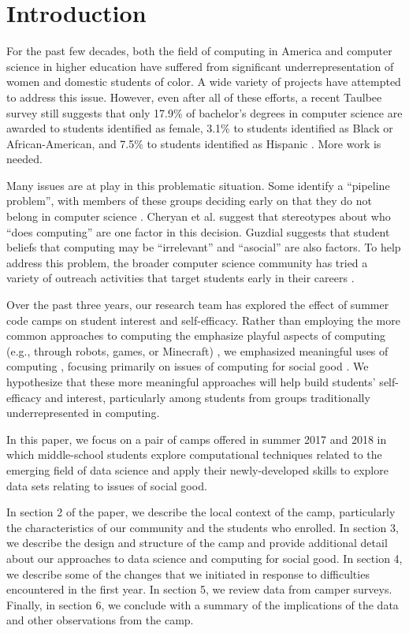 \section{Introduction}

For the past few decades, both the field of computing in America and
computer science in higher education have suffered from significant
underrepresentation of women and domestic students of color.  A
wide variety of projects have attempted to address this issue.
However, even after all of these efforts, a recent Taulbee survey
still suggests that only 17.9\% of bachelor's degrees in computer
science are awarded to students identified as female, 3.1\% to
students identified as Black or African-American, and 7.5\% to
students identified as Hispanic \cite{Taulbee2016}.  More work is
needed.

Many issues are at play in this problematic situation.  Some identify
a ``pipeline problem'', with members of these groups deciding
early on that they do not belong in computer science \cite{Gurer2002}.
Cheryan et al. \cite{Cheryan2010} suggest that stereotypes about
who ``does computing'' are one factor in this decision.  Guzdial
\cite{Guzdial2009} suggests that student beliefs that computing may
be ``irrelevant'' and ``asocial'' are also factors.  To help address
this problem, the broader computer science community has tried a
variety of outreach activities that target students early in their
careers \cite{McGill2015,Decker2016}.

Over the past three years, our research team has explored the effect
of summer code camps on student interest and self-efficacy.  Rather
than employing the more common approaches to computing the emphasize
playful aspects of computing (e.g., through robots, games, or
Minecraft) \cite{code-camp-survey-sigcse-2017}, we emphasized
meaningful uses of computing \cite{arts-coding,dssg-sigcse-2018},
focusing primarily on issues of computing for social good
\cite{Goldweber2013}.  We hypothesize that these more meaningful
approaches will help build students' self-efficacy and interest,
particularly among students from groups traditionally underrepresented
in computing.

In this paper, we focus on a pair of camps offered in summer 2017
and 2018 in which middle-school students explore computational
techniques related to the emerging field of data science and apply
their newly-developed skills to explore data sets relating to issues
of social good.

In section 2 of the paper, we describe the local context of the
camp, particularly the characteristics of our community and the
students who enrolled.  In section 3, we describe the design and
structure of the camp and provide additional detail about our
approaches to data science and computing for social good.  In section
4, we describe some of the changes that we initiated in response
to difficulties encountered in the first year.  In section 5, we
review data from camper surveys.  Finally, in section 6, we conclude
with a summary of the implications of the data and other observations
from the camp.

